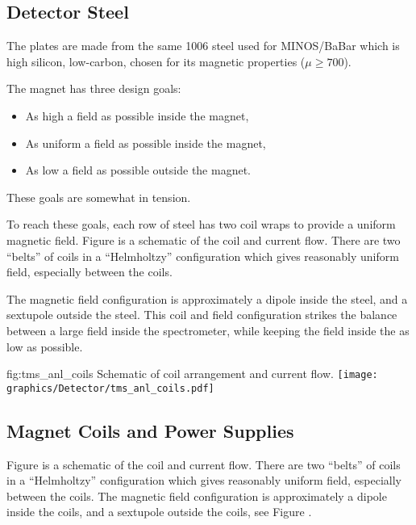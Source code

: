 \subsection{Detector Steel}
\label{sec:tms-des-steel}


The plates are made from the same 1006 steel used for  MINOS/BaBar which is high silicon, low-carbon, chosen for its magnetic properties ($\mu \ge 700$). 

The magnet has three design goals:
\begin{itemize}
    \item As high a field as possible inside the magnet,
    \item As uniform a field as possible inside the magnet,
    \item As low a field as possible outside the magnet.
\end{itemize}

These goals are somewhat in tension.

To reach these goals, each row of steel has two coil wraps to provide a uniform magnetic field.  Figure \cite{fig:tms_anl_coils} is a schematic of the coil and current flow.  There are two “belts” of coils in a “Helmholtzy” configuration which gives reasonably uniform field, especially between the coils.

The magnetic field configuration is approximately a dipole inside the steel, and a sextupole outside the steel.  This coil and field configuration strikes the balance between a large field inside the spectrometer, while keeping the field inside the  as low as possible. 

\begin{dunefigure}{fig:tms_anl_coils}
{Schematic of coil arrangement and current flow.}
\texttt{[image: graphics/Detector/tms\_anl\_coils.pdf]}
\end{dunefigure}

\subsection{Magnet Coils and Power Supplies}
\label{sec:tms-des-coil}

 Figure \cite{fig:tms_anl_coils} is a schematic of the coil and current flow.  There are two “belts” of coils in a “Helmholtzy” configuration which gives reasonably uniform field, especially between the coils.  
The magnetic field configuration is approximately a dipole inside the coils, and a sextupole outside the coils, see Figure \cite{}.  

